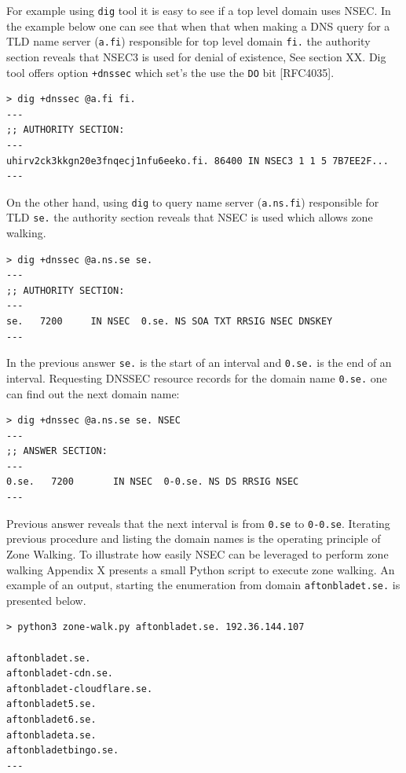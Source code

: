 For example using \texttt{dig} tool it is easy to see if a top level domain uses NSEC. In the example below one can see that when that when making a DNS query for a TLD name server (\texttt{a.fi}) responsible for top level domain \texttt{fi.} the authority section reveals that NSEC3 is used for denial of existence, See section XX. Dig tool offers option \texttt{+dnssec} which set's the use the \texttt{DO} bit [RFC4035].


\begin{verbatim}
> dig +dnssec @a.fi fi.
---
;; AUTHORITY SECTION:
---
uhirv2ck3kkgn20e3fnqecj1nfu6eeko.fi. 86400 IN NSEC3 1 1 5 7B7EE2F...
---
\end{verbatim}

On the other hand, using \texttt{dig} to query name server (\texttt{a.ns.fi}) responsible for TLD \texttt{se.} the authority section reveals that NSEC is used which allows zone walking.

\begin{verbatim}
> dig +dnssec @a.ns.se se.
---
;; AUTHORITY SECTION:
---
se.   7200	   IN NSEC 	0.se. NS SOA TXT RRSIG NSEC DNSKEY
---
\end{verbatim}

In the previous answer \texttt{se.} is the start of an interval and \texttt{0.se.} is the end of an interval. Requesting DNSSEC resource records for the domain name \texttt{0.se.} one can find out the next domain name:

\begin{verbatim}
> dig +dnssec @a.ns.se se. NSEC
---
;; ANSWER SECTION:
---
0.se.   7200	   IN NSEC 	0-0.se. NS DS RRSIG NSEC
---
\end{verbatim}

Previous answer reveals that the next interval is from \texttt{0.se} to \texttt{0-0.se}. Iterating previous procedure and listing the domain names is the operating principle of Zone Walking. To illustrate how easily NSEC can be leveraged to perform zone walking Appendix X presents a small Python script to execute zone walking. An example of an output, starting the enumeration from domain \texttt{aftonbladet.se.} is presented below.

\begin{verbatim}
> python3 zone-walk.py aftonbladet.se. 192.36.144.107

aftonbladet.se.
aftonbladet-cdn.se.
aftonbladet-cloudflare.se.
aftonbladet5.se.
aftonbladet6.se.
aftonbladeta.se.
aftonbladetbingo.se.
---
\end{verbatim}

